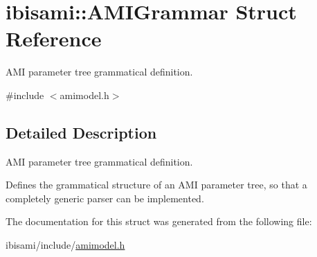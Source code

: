 \hypertarget{structibisami_1_1_a_m_i_grammar}{}\section{ibisami\+:\+:A\+M\+I\+Grammar Struct Reference}
\label{structibisami_1_1_a_m_i_grammar}


A\+M\+I parameter tree grammatical definition.  




{\ttfamily \#include $<$amimodel.\+h$>$}



\subsection{Detailed Description}
A\+M\+I parameter tree grammatical definition. 

Defines the grammatical structure of an A\+M\+I parameter tree, so that a completely generic parser can be implemented. 

The documentation for this struct was generated from the following file\+:\begin{DoxyCompactItemize}
\item 
ibisami/include/\hyperlink{amimodel_8h}{amimodel.\+h}\end{DoxyCompactItemize}
